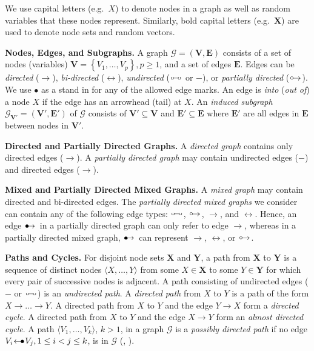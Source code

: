 \documentclass[twoside]{article}
\newcommand{\mb}[1]{\mathbf{#1}}
\newcommand{\g}[1][G]{\mathcal{#1}}
\newcommand{\bulletarrow}{
  \setlength{\unitlength}{1mm}
  \begin{picture}(5,1)(0,0)
    \put(0.2,0){$\bullet$}
    \put(1,0){$\rightarrow$}
  \end{picture}
}
\newcommand{\arrowbullet}{
  \setlength{\unitlength}{1mm}
  \begin{picture}(5,1)(0,0)
    \put(0.2,0){$\leftarrow$}
    \put(3,0){$\bullet$}
  \end{picture}
}
\newcommand{\circarrow}{
  \setlength{\unitlength}{1mm}
  \begin{picture}(5,1)(0,0)
    \put(1,1){\circle{1}}
    \put(1.2,0){$\rightarrow$}
  \end{picture}
}
\newcommand{\circcirc}{
  \setlength{\unitlength}{1mm}
  \begin{picture}(5,1)(0,0)
    \put(1,1){\circle{1}}
    \put(1.5,1){\line(1,0){2}}
    \put(4,1){\circle{1}}
  \end{picture}
}
\begin{document}
We use capital letters (e.g.\ $X$) to denote nodes in a graph as well as random variables that these nodes represent. Similarly, bold capital letters (e.g.\ $\mb{X}$) are used to denote node sets and random vectors.

\textbf{Nodes, Edges, and Subgraphs.}
A graph $\g=(\mb{V},\mb{E})$ consists of a set of nodes (variables) $\mb{V}=\left\lbrace V_{1},\dots,V_{p}\right\rbrace, p \ge 1$, and a set of edges $\mb{E}$.  Edges can be \textit{directed} ($\rightarrow$),  \textit{bi-directed}  ($\leftrightarrow$), \textit{undirected} ($\circcirc$ or $-$), or \textit{partially directed} ($\circarrow$). We use $\bullet$ as a stand in for any of the allowed edge marks. An edge is \textit{into} (\textit{out of}) a node $X$ if the edge has an arrowhead (tail) at $X$. An \textit{induced subgraph} $\g_{\mb{V'}} =(\mb{V'}, \mb{E'})$ of $\g$ consists of $\mb{V'} \subseteq \mb{V}$ and $\mb{E'} \subseteq \mb{E}$ where $\mb{E'}$ are all edges in $\mb{E}$ between nodes in $\mb{V'}$. 

\textbf{Directed and Partially Directed Graphs.}
A \textit{directed graph} contains only directed edges ($\to$). A \textit{partially directed graph} may contain undirected edges ($-$) and directed edges ($\to$).

\textbf{Mixed and Partially Directed Mixed Graphs.}
A \textit{mixed graph} may contain directed and bi-directed edges. The \textit{partially directed mixed graphs} we consider can contain any of the following edge types: $\circcirc$, $\circarrow$, $\to$, and $\leftrightarrow$. Hence, an edge $\bulletarrow$ in a partially directed graph can only refer to edge $\to$, whereas in a partially directed mixed graph, $\bulletarrow$ can represent $\to$, $\leftrightarrow$, or $\circarrow$.

\textbf{Paths and Cycles.}
For disjoint node sets $\mb{X}$ and $\mb{Y}$, a path from $\mb{X}$ to $\mb{Y}$ is a sequence of distinct nodes $\langle X, \dots,Y \rangle$ from some $X \in \mb{X}$ to some $Y \in \mb{Y}$ for which every pair of successive nodes is adjacent. A path consisting of undirected edges ($-$ or $\circcirc$) is an \textit{undirected path}. A \textit{directed path} from $X$ to $Y$ is a path of the form $X \to \dots \to Y$. A directed path from $X$ to $Y$ and the edge $Y \to X$ form a \textit{directed cycle}. A directed path from $X$ to $Y$ and the edge $X \to Y$ form an \textit{almost directed cycle}. A path $\langle V_1, \dots, V_k \rangle$, $k>1$, in a graph $\g$ is a \textit{possibly directed path} if no edge $V_i \arrowbullet V_j, 1 \le i < j \le k$, is in $\g$ (\citealp{perkovic2017interpreting}, \citealp{zhang2008causal}).
\end{document}
